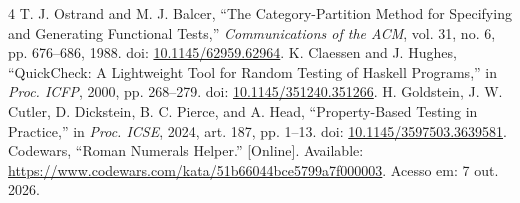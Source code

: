 \documentclass[11pt,a4paper]{article}
\begin{document}
\begingroup
\small
\begin{thebibliography}{4}
 T. J. Ostrand and M. J. Balcer, ``The Category-Partition Method for Specifying and Generating Functional Tests,'' \emph{Communications of the ACM}, vol. 31, no. 6, pp. 676--686, 1988. doi: \href{https://doi.org/10.1145/62959.62964}{10.1145/62959.62964}.
 K. Claessen and J. Hughes, ``QuickCheck: A Lightweight Tool for Random Testing of Haskell Programs,'' in \emph{Proc. ICFP}, 2000, pp. 268--279. doi: \href{https://doi.org/10.1145/351240.351266}{10.1145/351240.351266}.
 H. Goldstein, J. W. Cutler, D. Dickstein, B. C. Pierce, and A. Head, ``Property-Based Testing in Practice,'' in \emph{Proc. ICSE}, 2024, art. 187, pp. 1--13. doi: \href{https://doi.org/10.1145/3597503.3639581}{10.1145/3597503.3639581}.
 Codewars, ``Roman Numerals Helper.'' [Online]. Available: \url{https://www.codewars.com/kata/51b66044bce5799a7f000003}. Acesso em: 7 out. 2026.
\end{thebibliography}
\endgroup
\end{document}
